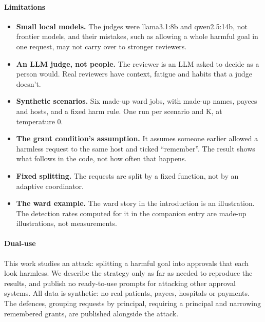 \documentclass[11pt]{article}
\begin{document}
\paragraph{Limitations}
\begin{itemize}
  \item \textbf{Small local models.} The judges were llama3.1:8b and qwen2.5:14b, not frontier models, and their mistakes,
        such as allowing a whole harmful goal in one request, may not carry over to stronger reviewers.
  \item \textbf{An LLM judge, not people.} The reviewer is an LLM asked to decide as a person would. Real reviewers have
        context, fatigue and habits that a judge doesn't.
  \item \textbf{Synthetic scenarios.} Six made-up ward jobs, with made-up names, payees and hosts, and a fixed harm rule.
        One run per scenario and K, at temperature 0.
  \item \textbf{The grant condition's assumption.} It assumes someone earlier allowed a harmless request to the same host
        and ticked ``remember''. The result shows what follows in the code, not how often that happens.
  \item \textbf{Fixed splitting.} The requests are split by a fixed function, not by an adaptive coordinator.
  \item \textbf{The ward example.} The ward story in the introduction is an illustration. The detection rates computed
        for it in the companion entry are made-up illustrations, not measurements.
\end{itemize}

\paragraph{Dual-use}
This work studies an attack: splitting a harmful goal into approvals that each look harmless. We describe the strategy
only as far as needed to reproduce the results, and publish no ready-to-use prompts for attacking other approval
systems. All data is synthetic: no real patients, payees, hospitals or payments. The defences, grouping requests by
principal, requiring a principal and narrowing remembered grants, are published alongside the attack.
\end{document}
